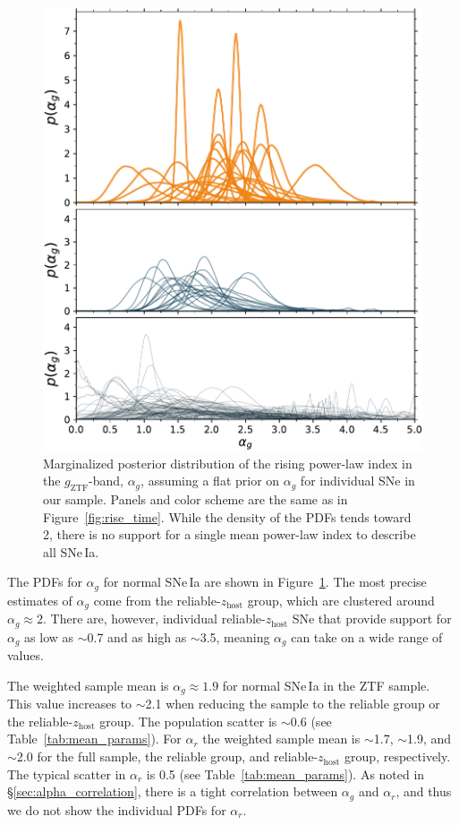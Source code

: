 \documentclass[twocolumn]{./aastex63}
\newcommand{\gztf}{$g_\mathrm{ZTF}$}
\begin{document}
\begin{figure}
    \centering
    \includegraphics[width=1\linewidth]{./figures/alpha_g.pdf}
    \caption{Marginalized posterior distribution of the rising power-law index
    in the \gztf-band, $\alpha_g$, assuming a flat prior on $\alpha_g$ for
    individual SNe in our sample. Panels and color scheme are the
    same as in Figure~\ref{fig:rise_time}. While the density of the PDFs tends
    toward 2, there is no support for a single mean power-law index to
    describe all SNe\,Ia.}
    \label{fig:alpha_rise}
\end{figure}

The PDFs for $\alpha_g$ for normal SNe\,Ia are shown in
Figure~\ref{fig:alpha_rise}. The most precise estimates of $\alpha_g$ come
from the reliable-$z_\mathrm{host}$ group, which are clustered around
$\alpha_g \approx 2$. There are, however, individual
reliable-$z_\mathrm{host}$ SNe that provide support for $\alpha_g$ as low as
$\sim$0.7 and as high as $\sim$3.5, meaning $\alpha_g$ can take on a wide
range of values.

The weighted sample mean is $\alpha_g \approx 1.9$ for normal SNe\,Ia in the
ZTF sample. This value increases to $\sim$2.1 when reducing the sample to the
reliable group or the reliable-$z_\mathrm{host}$ group. The population scatter
is $\sim$0.6 (see Table~\ref{tab:mean_params}). For $\alpha_r$ the weighted
sample mean is $\sim$1.7, $\sim$1.9, and $\sim$2.0 for the full sample, the
reliable group, and reliable-$z_\mathrm{host}$ group, respectively. The
typical scatter in $\alpha_r$ is 0.5 (see Table~\ref{tab:mean_params}). As
noted in \S\ref{sec:alpha_correlation}, there is a tight correlation
between $\alpha_g$ and $\alpha_r$, and thus we do not show the individual PDFs
for $\alpha_r$.
\end{document}
